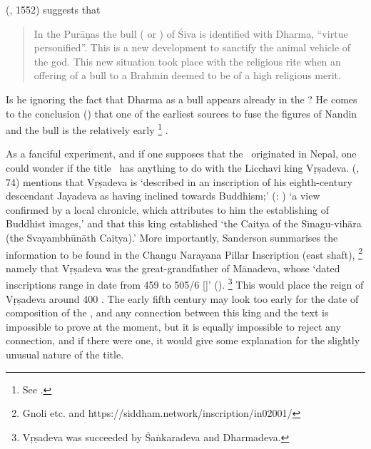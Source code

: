 \documentclass[11pt]{book}
\begin{document}
\citeauthor{bhattacharya_nandin_1977} (\citeyear{bhattacharya_nandin_1977}, {1552}) suggests that

\begin{quote}
In the Purāṇas the bull 
( or 
) 
of Śiva is identified with Dharma, ``virtue personified''. 
This is a new development to sanctify the animal 
vehicle of the god. This new situation took place with the religious 
rite when an offering of a bull to a Brahmin deemed to be
of a high religious merit.
\end{quote}

\noindent
Is he ignoring the fact that Dharma as
a bull appears already in the \MBh?
He comes to the conclusion 
()
that one of the earliest sources to fuse the figures
of Nandin and the bull is the relatively early%
		\footnote{See .}
\MatsP.


As a fanciful experiment, and if one supposes that the 
\VSS\ originated in Nepal, one could wonder if the 
title \Vss\ has anything to do with the Licchavi king
Vṛṣadeva.
\citeauthor{SandersonSaivaAge} 
(\citeyear{SandersonSaivaAge}, 74) mentions that  
Vṛṣadeva is `described in an inscription of his eighth-century 
descendant Jayadeva as having inclined towards Buddhism;'
(: 
) 
`a view conﬁrmed by a local chronicle, which attributes to
him the establishing of Buddhist images,'
and that this king established 
`the Caitya of the Sı̄nagu-vihāra (the Svayambhūnāth Caitya).'
More importantly, Sanderson summarises the 
information to be found in the 
Changu Narayana Pillar Inscription (east shaft),%
		\footnote{Gnoli etc. and 
		https://siddham.network/inscription/in02001/} 
namely that Vṛṣadeva was the great-grandfather of Mānadeva, whose
`dated inscriptions range in date from 459 to 505/6 [\CE]'
().%
	   \footnote{Vṛṣadeva was succeeded by Śaṅkaradeva and
	   		            Dharmadeva.}
This would place 
the reign of Vṛṣadeva around 400 \CE. 
The early fifth century may look too early for the date of composition
of the \Vss, and any connection between this king
and the text is impossible to prove at the moment, 
but it is equally impossible to reject any connection, 
and if there were one, it would give some explanation for the slightly
unusual nature of the title.
\hide{
}
\end{document}
